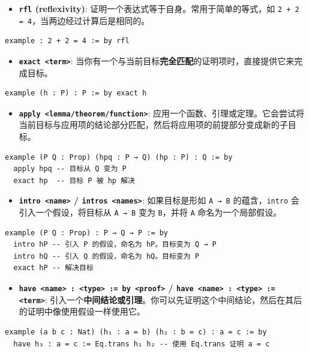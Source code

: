 \documentclass{amsart}
\theoremstyle{plain}
\theoremstyle{definition}
\theoremstyle{remark}
\begin{document}
\begin{enumerate}
\begin{itemize}
		\item \textbf{\lstinline{rfl} (reflexivity)}: 证明一个表达式等于自身。常用于简单的等式，如 \lstinline{2 + 2 = 4}，当两边经过计算后是相同的。
	\end{itemize}
\begin{lstlisting}[language=lean]
example : 2 + 2 = 4 := by rfl
\end{lstlisting}	\begin{itemize}
		\item \textbf{\lstinline{exact <term>}}: 当你有一个与当前目标\textbf{完全匹配}的证明项时，直接提供它来完成目标。
	\end{itemize}
\begin{lstlisting}[language=lean]
example (h : P) : P := by exact h
\end{lstlisting}	\begin{itemize}
		\item \textbf{\lstinline{apply <lemma/theorem/function>}}: 应用一个函数、引理或定理。它会尝试将当前目标与应用项的结论部分匹配，然后将应用项的前提部分变成新的子目标。
	\end{itemize}
\begin{lstlisting}[language=lean]
example (P Q : Prop) (hpq : P → Q) (hp : P) : Q := by
  apply hpq -- 目标从 Q 变为 P
  exact hp  -- 目标 P 被 hp 解决
\end{lstlisting}	\begin{itemize}
		\item \textbf{\lstinline{intro <name>} / \lstinline{intros <names>}}: 如果目标是形如 \lstinline{A → B} 的蕴含，\lstinline{intro} 会引入一个假设，将目标从 \lstinline{A → B} 变为 \lstinline{B}，并将 \lstinline{A} 命名为一个局部假设。
	\end{itemize}
\begin{lstlisting}[language=lean]
example (P Q : Prop) : P → Q → P := by
  intro hP -- 引入 P 的假设，命名为 hP。目标变为 Q → P
  intro hQ -- 引入 Q 的假设，命名为 hQ。目标变为 P
  exact hP -- 解决目标
\end{lstlisting}	\begin{itemize}
		\item \textbf{\lstinline{have <name> : <type> := by <proof>} / \lstinline{have <name> : <type> := <term>}}: 引入一个\textbf{中间结论或引理}。你可以先证明这个中间结论，然后在其后的证明中像使用假设一样使用它。
	\end{itemize}
\begin{lstlisting}[language=lean]
example (a b c : Nat) (h₁ : a = b) (h₂ : b = c) : a = c := by
  have h₃ : a = c := Eq.trans h₁ h₂ -- 使用 Eq.trans 证明 a = c

\end{lstlisting}
\end{enumerate}
\end{document}

